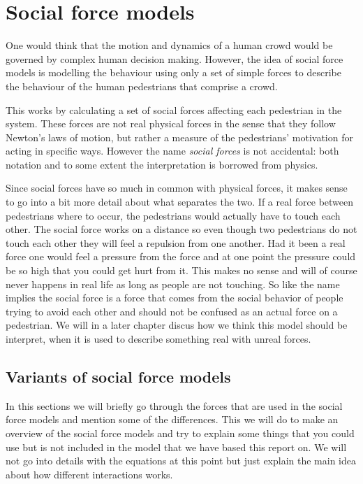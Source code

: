 \section{Social force models}
\label{sec:social-forces}
One would think that the motion and dynamics of a human crowd would be
governed by complex human decision making. However, the idea of social force
models is modelling the behaviour using only a set of simple forces to
describe the behaviour of the human pedestrians that comprise a crowd.

This works by calculating a set of social forces affecting each pedestrian in the system.
These forces are not real physical forces in the sense
that they follow Newton's laws of motion, but rather a measure of the pedestrians'
motivation for acting in specific ways. However the name \emph{social forces}
is not accidental: both notation and to some extent the interpretation is
borrowed from physics.

Since social forces have so much in common with physical forces, it makes
sense to go into a bit more detail about what separates the two. If a real
force between pedestrians where to occur, the pedestrians would actually have
to touch each other. The social force works on a distance so even though
two pedestrians do not touch each other they will feel a repulsion from one another. Had it been a real force one
would feel a pressure from the force and at one point the pressure could be
so high that you could get hurt from it. This makes no sense and will of course
never happens in real life as long as people are not touching. So like the name
implies the social force is a force that comes from the social behavior of people
trying to avoid each other and should not be confused as an actual force on a pedestrian.
We will in a later chapter discus how we think this model should be interpret, when it is used to describe something real with unreal forces.


\subsection{Variants of social force models}
In this sections we will briefly go through the forces that are used in the social force models
and mention some of the differences. This we will do to make an overview of the social force models
and try to explain some things that you could use but is not included in the model that we have
based this report on. We will not go into details with the equations at this point but just explain
the main idea about how different interactions works.


